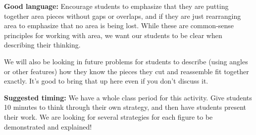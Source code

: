 \documentclass[noauthor,nooutcomes, handout]{ximera}
\begin{document}
\begin{instructorNotes}
{\bf Good language:} Encourage students to emphasize that they are putting together area pieces without gaps or overlaps, and if they are just rearranging area to emphasize that no area is being lost. While these are common-sense principles for working with area, we want our students to be clear when describing their thinking.

We will also be looking in future problems for students to describe (using angles or other features) how they know the pieces they cut and reassemble fit together exactly. It's good to bring that up here even if you don't discuss it.

{\bf Suggested timing:} We have a whole class period for this activity. Give students 10 minutes to think through their own strategy, and then have students present their work. We are looking for several strategies for each figure to be demonstrated and explained!
\end{instructorNotes}
\end{document}
